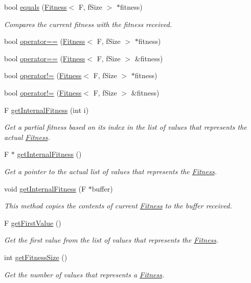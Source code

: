 \begin{DoxyCompactItemize}
bool \hyperlink{structFitness_acfc0528bc5ec716f1c06a58086c59b50}{equals} (\hyperlink{structFitness}{Fitness}$<$ F, f\+Size $>$ $\ast$fitness)
\begin{DoxyCompactList}\small\item\em Compares the current fitness with the fitness received. \end{DoxyCompactList}\item 
bool \hyperlink{structFitness_a87880c3a43c0bf6068c687d71e96bbfc}{operator==} (\hyperlink{structFitness}{Fitness}$<$ F, f\+Size $>$ $\ast$fitness)
\item 
bool \hyperlink{structFitness_a525bb798a0016fada60e60a601c46510}{operator==} (\hyperlink{structFitness}{Fitness}$<$ F, f\+Size $>$ \&fitness)
\item 
bool \hyperlink{structFitness_a4cab5f7960366b61b34213efc89a4288}{operator!=} (\hyperlink{structFitness}{Fitness}$<$ F, f\+Size $>$ $\ast$fitness)
\item 
bool \hyperlink{structFitness_a01be3acc37c269b11b2697d135759f20}{operator!=} (\hyperlink{structFitness}{Fitness}$<$ F, f\+Size $>$ \&fitness)
\item 
F \hyperlink{structFitness_a50bf7f366d9e182293184ebee7297df1}{get\+Internal\+Fitness} (int i)
\begin{DoxyCompactList}\small\item\em Get a partial fitness based on its index in the list of values that represents the actual \hyperlink{structFitness}{Fitness}. \end{DoxyCompactList}\item 
F $\ast$ \hyperlink{structFitness_ab25220be9e68b4737a91a7b307c5e4d5}{get\+Internal\+Fitness} ()
\begin{DoxyCompactList}\small\item\em Get a pointer to the actual list of values that represents the \hyperlink{structFitness}{Fitness}. \end{DoxyCompactList}\item 
void \hyperlink{structFitness_aeb0b0935f54a9798faf30ddb4216d10a}{get\+Internal\+Fitness} (F $\ast$buffer)
\begin{DoxyCompactList}\small\item\em This method copies the contents of current \hyperlink{structFitness}{Fitness} to the buffer received. \end{DoxyCompactList}\item 
F \hyperlink{structFitness_ac6513eb1ca76f5618cbc0a2f4e25139c}{get\+First\+Value} ()
\begin{DoxyCompactList}\small\item\em Get the first value from the list of values that represents the \hyperlink{structFitness}{Fitness}. \end{DoxyCompactList}\item 
int \hyperlink{structFitness_acebcc12ee16b4c1a95f9a16c0ba82191}{get\+Fitness\+Size} ()
\begin{DoxyCompactList}\small\item\em Get the number of values that represents a \hyperlink{structFitness}{Fitness}. \end{DoxyCompactList}\end{DoxyCompactItemize}
